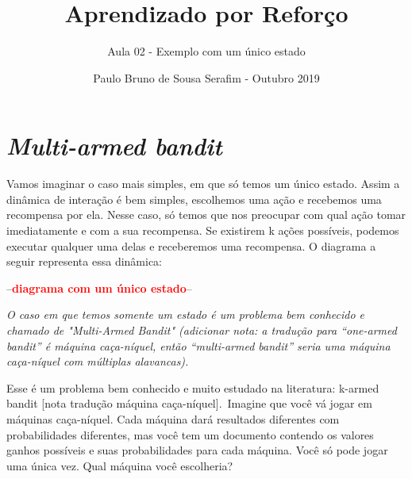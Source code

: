 \documentclass{article}
\title{Aprendizado por Reforço}
\author{Aula 02 - Exemplo com um único estado}
\date{Paulo Bruno de Sousa Serafim - Outubro 2019}
\newcommand{\todo}[1]{ --\textcolor{red}{\textbf{#1}}--}
\begin{document}
\maketitle

\section{\textit{Multi-armed bandit}}

    Vamos imaginar o caso mais simples, em que só temos um único estado. Assim a dinâmica de interação é bem simples, escolhemos uma ação e recebemos uma recompensa por ela. Nesse caso, só temos que nos preocupar com qual ação tomar imediatamente e com a sua recompensa. Se existirem k ações possíveis, podemos executar qualquer uma delas e receberemos uma recompensa. O diagrama a seguir representa essa dinâmica:

    \todo{diagrama com um único estado}

    \textit{O caso em que temos somente um estado é um problema bem conhecido e chamado de "Multi-Armed Bandit" (adicionar nota: a tradução para ``one-armed bandit'' é máquina caça-níquel, então ``multi-armed bandit'' seria uma máquina caça-níquel com múltiplas alavancas).}
    
    Esse é um problema bem conhecido e muito estudado na literatura: k-armed bandit [nota tradução máquina caça-níquel]. Imagine que você vá jogar em máquinas caça-níquel. Cada máquina dará resultados diferentes com probabilidades diferentes, mas você tem um documento contendo os valores ganhos possíveis e suas probabilidades para cada máquina. Você só pode jogar uma única vez. Qual máquina você escolheria?

    \begin{center}
    \end{center}
\end{document}
